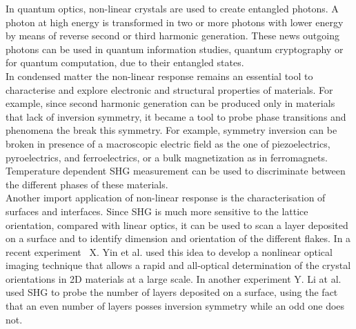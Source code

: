 In quantum optics, non-linear crystals are used to create entangled photons. A photon at high energy is transformed in two or more photons with lower energy by means of reverse second or third harmonic generation. These news outgoing photons can be used in quantum information studies, quantum cryptography or for quantum computation, due to their entangled states.\cite{PhysRevLett.75.4337}\\ 
In condensed matter the non-linear response remains an essential tool to characterise and explore electronic and structural properties of materials. 
For example, since second harmonic generation can be produced only in materials that lack of inversion symmetry, it became a tool to probe phase transitions and phenomena the break this symmetry.
For example, symmetry inversion can be broken in presence of a macroscopic electric field as the one of piezoelectrics, pyroelectrics, and ferroelectrics, or a bulk magnetization as in ferromagnets. Temperature dependent SHG measurement can be used to discriminate between the different phases of these materials.\\ %
Another import application of non-linear response is the characterisation of surfaces and interfaces. Since SHG is much more sensitive to the lattice orientation, compared with linear optics, it can be used to scan a layer deposited on a surface and to identify  dimension and orientation of the different flakes. 
In a recent experiment~\cite{yin2014edge}  X. Yin et al. used this idea to develop a nonlinear optical imaging technique that allows a rapid and all-optical determination of the crystal orientations in 2D materials at a large scale. %
In another experiment Y. Li at al. used SHG to probe the number of layers deposited on a surface, using the fact that an even number of layers posses inversion symmetry while an odd one does not.\cite{doi:10.1021/nl401561r}\\
